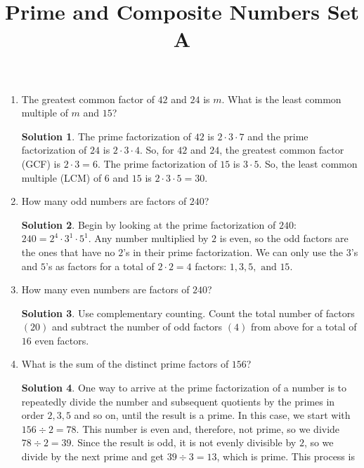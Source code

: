 \documentclass[twocolumn]{article}
\title{Prime and Composite Numbers Set A}
\date{}
\author{}
\theoremstyle{definition}
\newtheorem*{solution}{Solution}
\begin{document}
\maketitle
\begin{enumerate}
    \item The greatest common factor of $42$ and $24$ is $m$. What is the least
        common multiple of $m$ and $15$?
        \begin{solution}
            The prime factorization of $42$ is $2 \cdot 3 \cdot 7$ and the prime 
            factorization of $24$ is $2 \cdot 3 \cdot 4$. So, for $42$ and $24$, 
            the greatest common factor (GCF) is $2 \cdot 3 = 6$. The prime
            factorization of $15$ is $3 \cdot 5$. So, the least common multiple
            (LCM) of $6$ and $15$ is $2 \cdot 3 \cdot 5 = 30$.
        \end{solution}
    \item How many odd numbers are factors of $240$?
        \begin{solution}
            Begin by looking at the prime factorization of $240$: $240 = 2^4 \cdot
            3^1 \cdot 5^1$. Any number multiplied by $2$ is even, so the odd factors
            are the ones that have no $2$'s in their prime factorization. We can only
            use the $3$'s and $5$'s as factors for a total of $2 \cdot 2 = 4$ factors:
            $1, 3, 5, \textrm{ and } 15$. 
        \end{solution}
    \item How many even numbers are factors of $240$?
        \begin{solution}
            Use complementary counting. Count the total number of factors $(20)$ and
            subtract the number of odd factors $(4)$ from above for a total of $16$
            even factors. 
        \end{solution}
    \item What is the sum of the distinct prime factors of $156$?
        \begin{solution}
            One way to arrive at the prime factorization of a number is to repeatedly
            divide the number and subsequent quotients by the primes in order $2, 3, 5$
            and so on, until the result is a prime. In this case, we start with $156 \div 2
            = 78$. This number is even and, therefore, not prime, so we divide $78 \div 2
            = 39$. Since the result is odd, it is not evenly divisible by $2$, so we divide
            by the next prime and get $39 \div 3 = 13$, which is prime. This process is

\end{solution}
\end{enumerate}
\end{document}
